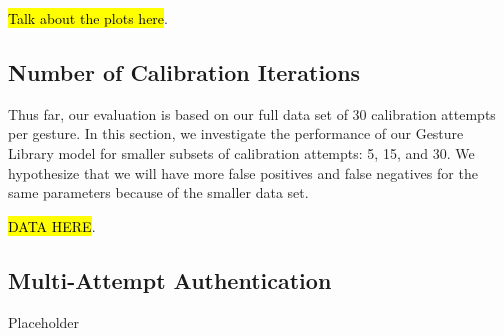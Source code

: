 \hl{Talk about the plots here}.

\subsection{Number of Calibration Iterations}

Thus far, our evaluation is based on our full data set of 30 calibration attempts per gesture. In this section, we investigate the performance of our Gesture Library model for smaller subsets of calibration attempts: 5, 15, and 30. We hypothesize that we will have more false positives and false negatives for the same parameters because of the smaller data set.

\hl{DATA HERE}.

\subsection{Multi-Attempt Authentication}

Placeholder

 

